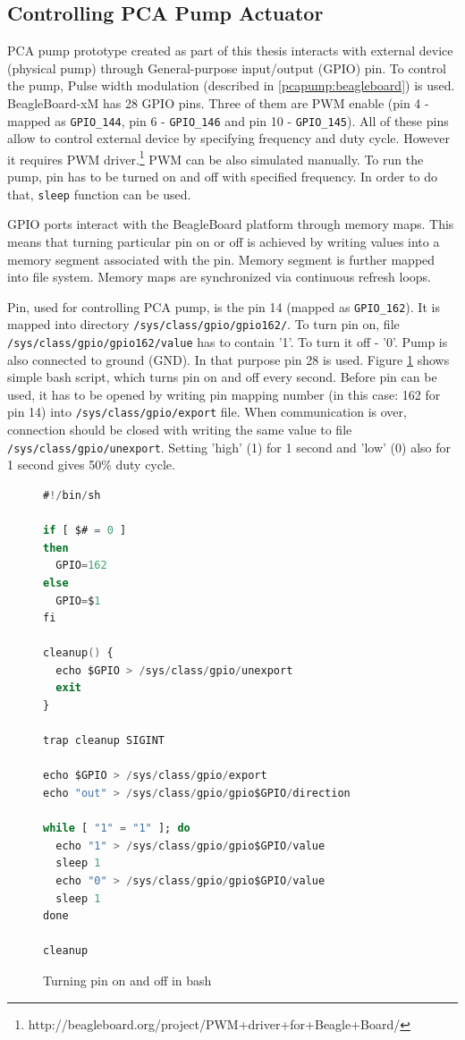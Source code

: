 \subsection{Controlling PCA Pump Actuator}
\label{pcapumpimpl:beagleboard:pcapumpmotor}

PCA pump prototype created as part of this thesis interacts with external device (physical pump) through General-purpose input/output (GPIO) pin. To control the pump, Pulse width modulation (described in \ref{pcapump:beagleboard}) is used. BeagleBoard-xM has 28 GPIO pins. Three of them are PWM enable (pin 4 - mapped as \lstinline{GPIO_144}, pin 6 - \lstinline{GPIO_146} and pin 10 - \lstinline{GPIO_145}). All of these pins allow to control external device by specifying frequency and duty cycle. However it requires PWM driver.\footnote{http://beagleboard.org/project/PWM+driver+for+Beagle+Board/} PWM can be also simulated manually. To run the pump, pin has to be turned on and off with specified frequency. In order to do that, \lstinline{sleep} function can be used. 

GPIO ports interact with the BeagleBoard platform through memory maps. This means that turning particular pin on or off is achieved by writing values into a memory segment associated with the pin. Memory segment is further mapped into file system. Memory maps are synchronized via continuous refresh loops.

Pin, used for controlling PCA pump, is the pin 14 (mapped as \lstinline{GPIO_162}). It is mapped into directory \lstinline{/sys/class/gpio/gpio162/}. To turn pin on, file \lstinline{/sys/class/gpio/gpio162/value} has to contain '1'. To turn it off - '0'. Pump is also connected to ground (GND). In that purpose pin 28 is used. Figure \ref{listing:SwitchingPin} shows simple bash script, which turns pin on and off every second. Before pin can be used, it has to be opened by writing pin mapping number (in this case: 162 for pin 14) into \lstinline{/sys/class/gpio/export} file. When communication is over, connection should be closed with writing the same value to file \lstinline{/sys/class/gpio/unexport}. Setting 'high' (1) for 1 second and 'low' (0) also for 1 second gives 50\% duty cycle.

\begin{figure}
\singlespacing
\begin{lstlisting}[language=ada, frame=single, gobble=0]
#!/bin/sh

if [ $# = 0 ]
then
  GPIO=162
else
  GPIO=$1
fi

cleanup() {
  echo $GPIO > /sys/class/gpio/unexport
  exit
}

trap cleanup SIGINT

echo $GPIO > /sys/class/gpio/export
echo "out" > /sys/class/gpio/gpio$GPIO/direction

while [ "1" = "1" ]; do
  echo "1" > /sys/class/gpio/gpio$GPIO/value
  sleep 1
  echo "0" > /sys/class/gpio/gpio$GPIO/value
  sleep 1
done

cleanup
\end{lstlisting} 
\doublespacing
\caption{Turning pin on and off in bash}
\label{listing:SwitchingPin}
\end{figure}

